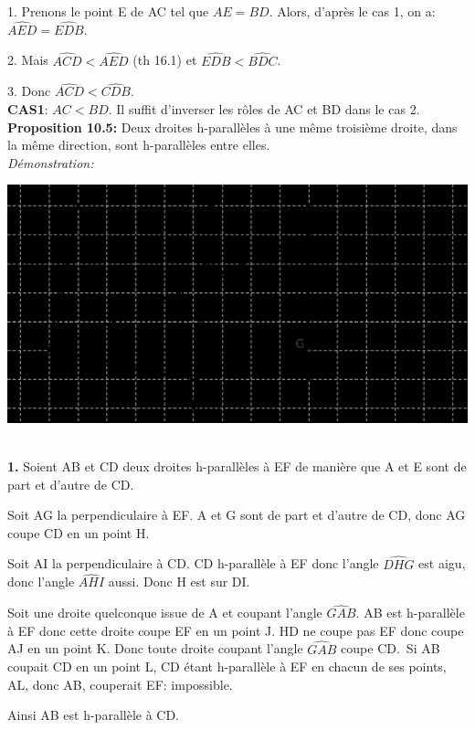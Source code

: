 \documentclass[a4paper, 12pt, twoside]{book}
\begin{document}
   1. Prenons le point E de AC tel que $AE=BD$. Alors, d'après le cas 1, on a: $\hat{AED}=\hat{EDB}$. \
   
   2. Mais $\hat{ACD}<\hat{AED}$ (th 16.1) et $\hat{EDB}<\hat{BDC}$.\
   
   3. Donc $\hat{ACD}<\hat{CDB}$.\\
   
 \textbf{ CAS1}: $AC<BD$. Il suffit d'inverser les rôles de AC et BD dans le cas 2.\\  
   
   \textbf{Proposition 10.5:} Deux droites h-parallèles à une même troisième droite, dans la même direction, sont h-parallèles entre elles.\\
   
   \textit{Démonstration:}\
   
  \includegraphics[scale=0.7]{figures/Lobat50.eps}\ \
  
  \textbf{1.} Soient AB et CD deux droites h-parallèles à EF de manière que A et E sont de part et d'autre de CD.\
  
  Soit AG la perpendiculaire à EF.  A et G sont de part et d'autre de CD, donc AG coupe CD en un point H.\
  
  Soit AI la perpendiculaire à CD. CD h-parallèle à EF donc l'angle $\hat{DHG}$ est aigu, donc l'angle $\hat{AHI}$ aussi. Donc H est sur DI.
  
  
  Soit une droite quelconque issue de A et coupant l'angle $\hat{GAB}$. AB est h-parallèle à EF donc cette droite coupe EF en un point J. HD ne coupe pas EF donc coupe AJ en un point K. Donc toute droite coupant l'angle $\hat{GAB}$ coupe CD.\
  Si AB coupait CD en un point L, CD étant h-parallèle à EF en chacun de ses points, AL, donc AB, couperait EF: impossible. \

  
  Ainsi AB est h-parallèle à CD.\\
        
\end{document}
